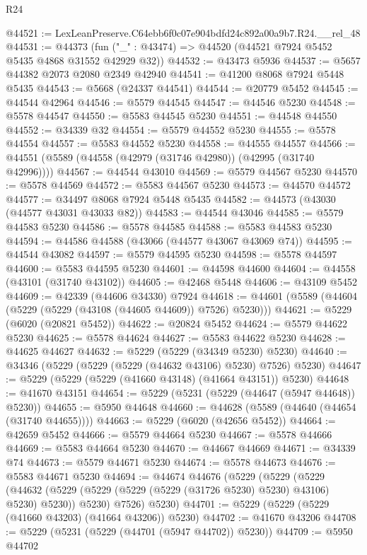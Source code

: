 \begin{lexlean}{R24}
\begin{coremodule}
@44521 := LexLeanPreserve.C64ebb6f0c07e904bdfd24c892a00a9b7.R24.__rel_48
@44531 := @44373 (fun ("_" : @43474) => @44520 (@44521 @7924 @5452 @5435 @4868 @31552 @42929 @32))
@44532 := @43473 @5936
@44537 := @5657 @44382 @2073 @2080 @2349 @42940
@44541 := @41200 @8068 @7924 @5448 @5435
@44543 := @5668 (@24337 @44541)
@44544 := @20779 @5452
@44545 := @44544 @42964
@44546 := @5579 @44545
@44547 := @44546 @5230
@44548 := @5578 @44547
@44550 := @5583 @44545 @5230
@44551 := @44548 @44550
@44552 := @34339 @32
@44554 := @5579 @44552 @5230
@44555 := @5578 @44554
@44557 := @5583 @44552 @5230
@44558 := @44555 @44557
@44566 := @44551 (@5589 (@44558 (@42979 (@31746 @42980)) (@42995 (@31740 @42996))))
@44567 := @44544 @43010
@44569 := @5579 @44567 @5230
@44570 := @5578 @44569
@44572 := @5583 @44567 @5230
@44573 := @44570 @44572
@44577 := @34497 @8068 @7924 @5448 @5435
@44582 := @44573 (@43030 (@44577 @43031 @43033 @82))
@44583 := @44544 @43046
@44585 := @5579 @44583 @5230
@44586 := @5578 @44585
@44588 := @5583 @44583 @5230
@44594 := @44586 @44588 (@43066 (@44577 @43067 @43069 @74))
@44595 := @44544 @43082
@44597 := @5579 @44595 @5230
@44598 := @5578 @44597
@44600 := @5583 @44595 @5230
@44601 := @44598 @44600
@44604 := @44558 (@43101 (@31740 @43102))
@44605 := @42468 @5448
@44606 := @43109 @5452
@44609 := @42339 (@44606 @34330) @7924
@44618 := @44601 (@5589 (@44604 (@5229 (@5229 (@43108 (@44605 @44609)) @7526) @5230)))
@44621 := @5229 (@6020 (@20821 @5452))
@44622 := @20824 @5452
@44624 := @5579 @44622 @5230
@44625 := @5578 @44624
@44627 := @5583 @44622 @5230
@44628 := @44625 @44627
@44632 := @5229 (@5229 (@34349 @5230) @5230)
@44640 := @34346 (@5229 (@5229 (@5229 (@44632 @43106) @5230) @7526) @5230)
@44647 := @5229 (@5229 (@5229 (@41660 @43148) (@41664 @43151)) @5230)
@44648 := @41670 @43151
@44654 := @5229 (@5231 (@5229 (@44647 (@5947 @44648)) @5230))
@44655 := @5950 @44648
@44660 := @44628 (@5589 (@44640 (@44654 (@31740 @44655))))
@44663 := @5229 (@6020 (@42656 @5452))
@44664 := @42659 @5452
@44666 := @5579 @44664 @5230
@44667 := @5578 @44666
@44669 := @5583 @44664 @5230
@44670 := @44667 @44669
@44671 := @34339 @74
@44673 := @5579 @44671 @5230
@44674 := @5578 @44673
@44676 := @5583 @44671 @5230
@44694 := @44674
    @44676
    (@5229
      (@5229
        (@5229
          (@44632 (@5229 (@5229 (@5229 (@5229 (@31726 @5230) @5230) @43106) @5230) @5230))
          @5230)
        @7526)
      @5230)
@44701 := @5229 (@5229 (@5229 (@41660 @43203) (@41664 @43206)) @5230)
@44702 := @41670 @43206
@44708 := @5229 (@5231 (@5229 (@44701 (@5947 @44702)) @5230))
@44709 := @5950 @44702

\end{coremodule}
\end{lexlean}
